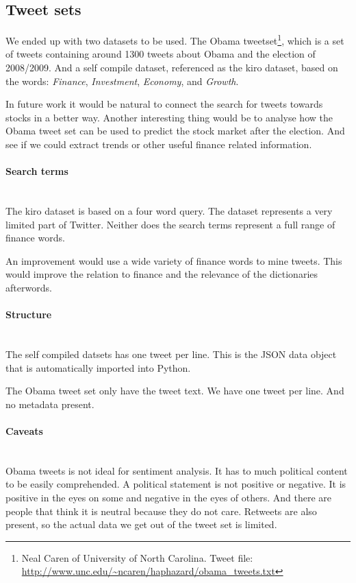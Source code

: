 \subsection{Tweet sets}
We ended up with two datasets to be used. The Obama tweetset\footnote{Neal
Caren of University of North Carolina. Tweet file:
\url{http://www.unc.edu/~ncaren/haphazard/obama_tweets.txt}}, which is a set of
tweets containing around 1300 tweets about Obama and the election of 2008/2009.
And a self compile dataset, referenced as the kiro dataset, based on the words:
\textit{Finance}, \textit{Investment}, \textit{Economy}, and \textit{Growth}. 

In future work it would be natural to connect the search for tweets towards
stocks in a better way. Another interesting thing would be to analyse how the
Obama tweet set can be used to predict the stock market after the election. And
see if we could extract trends or other useful finance related information.  

\paragraph{Search terms}
\hspace{0pt}\\
The kiro dataset is based on a four word query. The dataset represents a very
limited part of Twitter. Neither does the
search terms represent a full range of finance words.

An improvement would use a wide variety of finance words to mine tweets. This
would improve the relation to finance and the relevance of the dictionaries
afterwords. 

\paragraph{Structure}
\hspace{0pt}\\
The self compiled datsets has one tweet per line. This is the JSON data object
that is automatically imported into Python. 

The Obama tweet set only have the tweet text. We have one tweet per line. And
no metadata present. 

\paragraph{Caveats}
\hspace{0pt}\\
Obama tweets is not ideal for sentiment analysis. It has to much political
content to be easily comprehended. A political statement is not positive or
negative. It is positive in the eyes on some and negative in the eyes of others.
And there are people that think it is neutral because they do not care. Retweets
are also present, so the actual data we get out of the tweet set is limited. 

